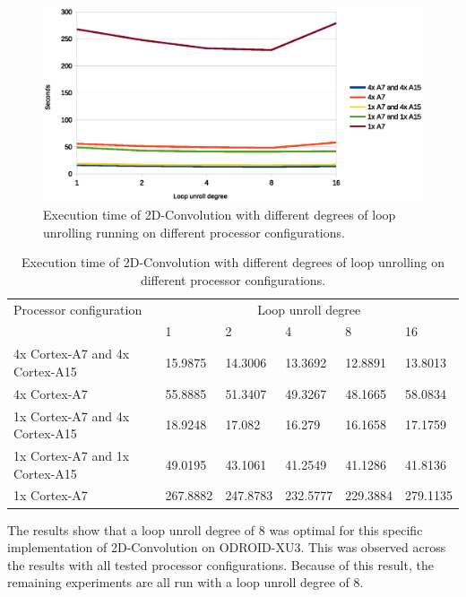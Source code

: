 \begin{figure}[H]
  \centering
  \includegraphics[width=160mm]{fig/loop-unroll-execution-time.eps}
  \caption{Execution time of 2D-Convolution with different degrees of loop unrolling running on different processor configurations. \label{overflow}}
\end{figure}
\begin{table}[H]
  \begin{tabular}{llllll}
    \toprule
    Processor configuration           & \multicolumn{5}{c}{Loop unroll degree} \\
                                      & 1                   & 2         & 4         & 8         & 16 \\
    \midrule
    4x Cortex-A7 and 4x Cortex-A15    & 15.9875             & 14.3006   & 13.3692   & 12.8891   & 13.8013 \\
    4x Cortex-A7                      & 55.8885             & 51.3407   & 49.3267   & 48.1665   & 58.0834 \\
    1x Cortex-A7 and 4x Cortex-A15    & 18.9248             & 17.082    & 16.279    & 16.1658   & 17.1759 \\
    1x Cortex-A7 and 1x Cortex-A15    & 49.0195             & 43.1061   & 41.2549   & 41.1286   & 41.8136 \\
    1x Cortex-A7                      & 267.8882            & 247.8783  & 232.5777  & 229.3884  & 279.1135 \\
    \bottomrule
  \end{tabular}
  \caption{Execution time of 2D-Convolution with different degrees of loop unrolling on different processor configurations. \label{overflow}}
\end{table}

The results show that a loop unroll degree of 8 was optimal for this specific implementation of 2D-Convolution on ODROID-XU3.
This was observed across the results with all tested processor configurations.
Because of this result, the remaining experiments are all run with a loop unroll degree of 8.

